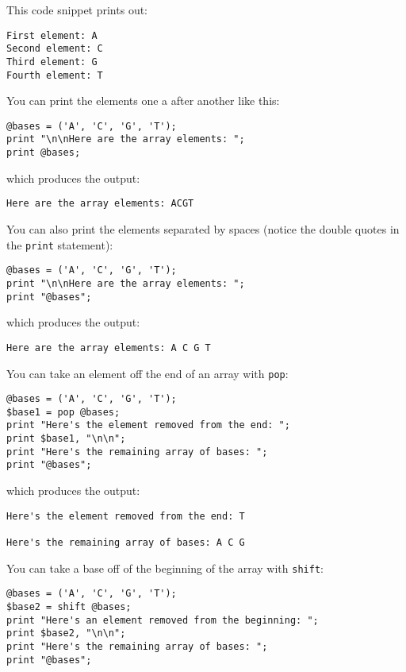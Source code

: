 This code snippet prints out:

\begin{lstlisting}
First element: A
Second element: C
Third element: G
Fourth element: T
\end{lstlisting}

You can print the elements one a after another like this:

\begin{lstlisting}
@bases = ('A', 'C', 'G', 'T');
print "\n\nHere are the array elements: ";
print @bases;
\end{lstlisting}

which produces the output:

\begin{lstlisting}
Here are the array elements: ACGT
\end{lstlisting}

You can also print the elements separated by spaces (notice the double quotes in the \verb|print| statement): 

\begin{lstlisting}
@bases = ('A', 'C', 'G', 'T');
print "\n\nHere are the array elements: ";
print "@bases";
\end{lstlisting}

which produces the output:

\begin{lstlisting}
Here are the array elements: A C G T
\end{lstlisting}

You can take an element off the end of an array with \verb|pop|: 

\begin{lstlisting}
@bases = ('A', 'C', 'G', 'T');
$base1 = pop @bases;
print "Here's the element removed from the end: ";
print $base1, "\n\n";
print "Here's the remaining array of bases: ";
print "@bases";
\end{lstlisting}

which produces the output:

\begin{lstlisting}
Here's the element removed from the end: T

Here's the remaining array of bases: A C G
\end{lstlisting}

You can take a base off of the beginning of the array with \verb|shift|:

\begin{lstlisting}
@bases = ('A', 'C', 'G', 'T');
$base2 = shift @bases;
print "Here's an element removed from the beginning: ";
print $base2, "\n\n";
print "Here's the remaining array of bases: ";
print "@bases";
\end{lstlisting}

